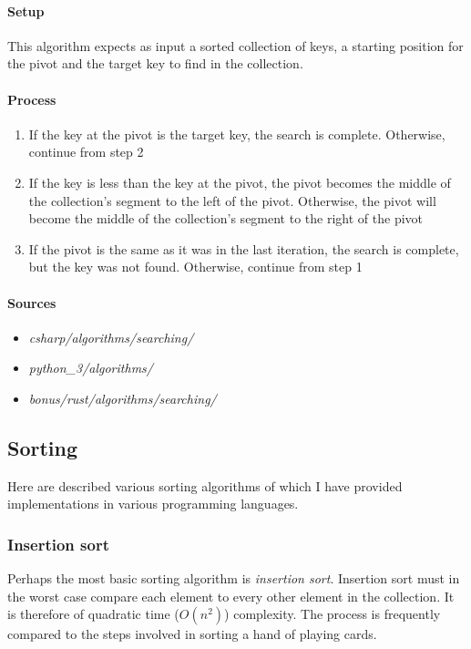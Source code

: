 \documentclass{article}
\begin{document}
{\paragraph{Setup}
This algorithm expects as input a sorted collection of keys, a starting position for the pivot and the target key to find in
the collection.

\paragraph{Process}
\begin{enumerate}
\item{If the key at the pivot is the target key, the search is complete. Otherwise, continue from step 2}
\item{If the key is less than the key at the pivot, the pivot becomes the middle of the collection's segment to the left of the
    pivot. Otherwise, the pivot will become the middle of the collection's segment to the right of the pivot}
\item{If the pivot is the same as it was in the last iteration, the search is complete, but the key was not found. Otherwise,
    continue from step 1}
\end{enumerate}

\begin{samepage}
  \paragraph{Sources}
  \begin{itemize}
  \item{{\em csharp/algorithms/searching/}}
  \item{{\em python\_3/algorithms/}}
  \item{{\em bonus/rust/algorithms/searching/}}
  \end{itemize}
\end{samepage}


\newpage


\subsection{Sorting}
Here are described various sorting algorithms of which I have provided implementations in various programming
languages.

\subsubsection{Insertion sort}
Perhaps the most basic sorting algorithm is {\em insertion sort}. Insertion sort must in the worst case compare
each element to every other element in the collection. It is therefore of quadratic time (\(O(n^2)\)) complexity.
The process is frequently compared to the steps involved in sorting a hand of playing cards.

}
\end{document}
